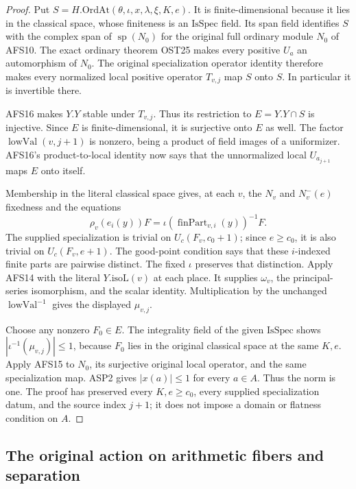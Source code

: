 \begin{proof}
Put $S=H.\mathrm{OrdAt}(\theta,\iota,x,\lambda,\xi,K,e)$.
It is finite-dimensional because it lies in the classical
space, whose finiteness is an $\mathrm{IsSpec}$ field.
Its span field identifies $S$ with the complex span of
$\operatorname{sp}(N_0)$ for the original full ordinary
module $N_0$ of AFS10.  The exact ordinary theorem OST25
makes every positive $U_a$ an automorphism of $N_0$.
The original specialization operator identity therefore
makes every normalized local positive operator $T_{v,j}$
map $S$ onto $S$.  In particular it is invertible there.

AFS16 makes $Y.Y$ stable under $T_{v,j}$.  Thus its
restriction to $E=Y.Y\cap S$ is injective.  Since $E$ is
finite-dimensional, it is surjective onto $E$ as well.
The factor $\operatorname{lowVal}(v,j+1)$ is nonzero,
being a product of field images of a uniformizer.
AFS16's product-to-local identity now says that the
unnormalized local $U_{a_{j+1}}$ maps $E$ onto itself.

Membership in the literal classical space gives, at each
$v$, the $N_v$ and $N_v^-(e)$ fixedness and the equations
\[
 \rho_v(e_i(y))F=
             \iota(\operatorname{finPart}_{v,i}(y))^{-1}F.
\]
The supplied specialization is trivial on $U_c(F_v,c_0+1)$;
since $e\geq c_0$, it is also trivial on $U_c(F_v,e+1)$.
The good-point condition says that these $i$-indexed
finite parts are pairwise distinct.  The fixed $\iota$
preserves that distinction.  Apply AFS14 with the literal
$Y.\mathrm{isoL}(v)$ at each place.  It supplies $\omega_v$,
the principal-series isomorphism, and the scalar identity.
Multiplication by the unchanged $\operatorname{lowVal}^{-1}$
gives the displayed $\mu_{v,j}$.

Choose any nonzero $F_0\in E$.  The integrality field of
the given $\mathrm{IsSpec}$ shows
$|\iota^{-1}(\mu_{v,j})|\leq1$, because $F_0$ lies in
the original classical space at the same $K,e$.
Apply AFS15 to $N_0$, its surjective original local
operator, and the same specialization map.  ASP2 gives
$|x(a)|\leq1$ for every $a\in A$.  Thus the norm is one.
The proof has preserved every $K,e\geq c_0$, every
supplied specialization datum, and the source index
$j+1$; it does not impose a domain or flatness condition
on $A$.
\end{proof}

\subsection{The original action on arithmetic fibers and separation}

